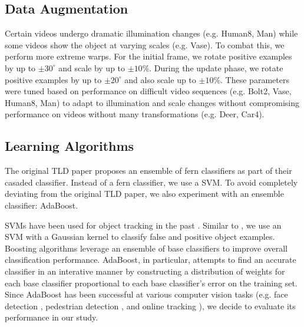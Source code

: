 \documentclass[10pt,twocolumn,letterpaper]{article}
\begin{document}
\subsection{Data Augmentation}

Certain videos undergo dramatic illumination changes (e.g. Human8, Man) while some videos show the object at varying scales (e.g. Vase). To combat this, we perform more extreme warps. For the initial frame, we rotate positive examples by up to $\pm 30^\circ$ and scale by up to $\pm 10\%$. During the update phase, we rotate positive examples by up to $\pm 20^\circ$ and also scale up to $\pm 10\%$. These parameters were tuned based on performance on difficult video sequences (e.g. Bolt2, Vase, Human8, Man) to adapt to illumination and scale changes without compromising performance on videos without many transformations (e.g. Deer, Car4).

\subsection{Learning Algorithms}

The original TLD paper proposes an ensemble of fern classifiers \cite{bosch2007image} as part of their casaded classifier. Instead of a fern classifier, we use a SVM. To avoid completely deviating from the original TLD paper, we also experiment with an ensemble classifier: AdaBoost.

SVMs have been used for object tracking in the past \cite{avidan2004support, tang2007co, papageorgiou1998general}. Similar to \cite{zhu2001tracking}, we use an SVM with a Gaussian kernel to classify false and positive object examples. %
Boosting algorithms leverage an ensemble of base classifiers to improve overall classification performance. AdaBoost, in particular, attempts to find an accurate classifier in an interative manner by constructing a distribution of weights for each base classifier proportional to each base classifier's error on the training set.  Since AdaBoost has been successful at various computer vision tasks (e.g. face detection \cite{viola2001rapid}, pedestrian detection \cite{viola2003detecting}, and online tracking \cite{grabner2006real}), we decide to evaluate its performance in our study. 


\end{document}
